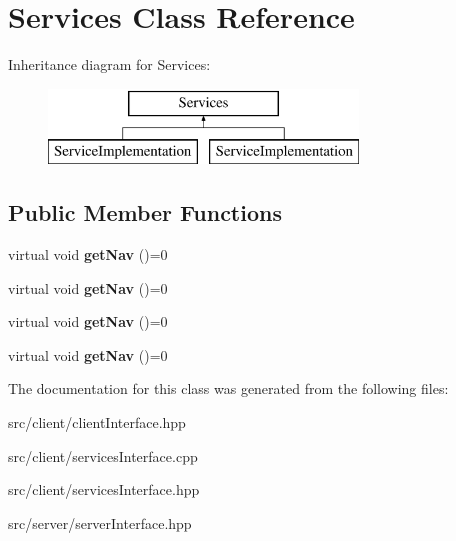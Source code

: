 \hypertarget{class_services}{}\section{Services Class Reference}
\label{class_services}
Inheritance diagram for Services\+:\begin{figure}[H]
\begin{center}
\leavevmode
\includegraphics[height=2.000000cm]{class_services}
\end{center}
\end{figure}
\subsection*{Public Member Functions}
\begin{DoxyCompactItemize}
\item 
virtual void {\bfseries get\+Nav} ()=0\hypertarget{class_services_a003919830789e1d96441e6f8c00929e0}{}\label{class_services_a003919830789e1d96441e6f8c00929e0}

\item 
virtual void {\bfseries get\+Nav} ()=0\hypertarget{class_services_a003919830789e1d96441e6f8c00929e0}{}\label{class_services_a003919830789e1d96441e6f8c00929e0}

\item 
virtual void {\bfseries get\+Nav} ()=0\hypertarget{class_services_a003919830789e1d96441e6f8c00929e0}{}\label{class_services_a003919830789e1d96441e6f8c00929e0}

\item 
virtual void {\bfseries get\+Nav} ()=0\hypertarget{class_services_a003919830789e1d96441e6f8c00929e0}{}\label{class_services_a003919830789e1d96441e6f8c00929e0}

\end{DoxyCompactItemize}


The documentation for this class was generated from the following files\+:\begin{DoxyCompactItemize}
\item 
src/client/client\+Interface.\+hpp\item 
src/client/services\+Interface.\+cpp\item 
src/client/services\+Interface.\+hpp\item 
src/server/server\+Interface.\+hpp\end{DoxyCompactItemize}
